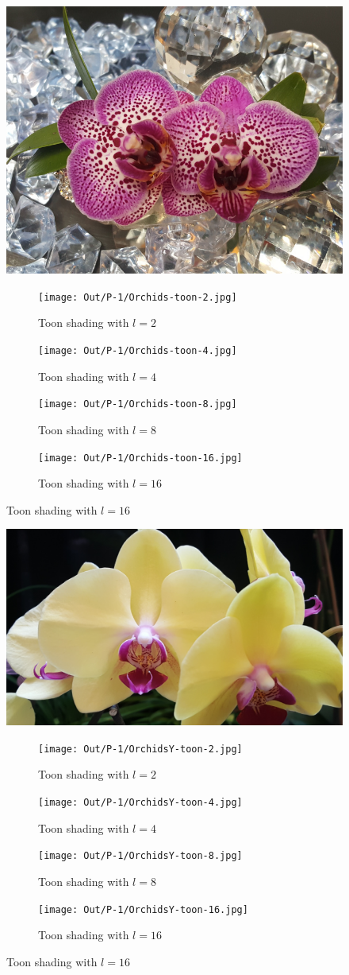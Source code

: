\documentclass[dvipsnames]{article}
\begin{document}
\begin{figure}[H]
	\centering\includegraphics[width=.5\linewidth]{Images/P-1/Orchids.jpg}
	\caption{Original Orchids.jpg}

	\begin{subfigure}{.33\linewidth}
		\centering\texttt{[image: Out/P-1/Orchids-toon-2.jpg]}
		\caption{Toon shading with $l = 2$}
	\end{subfigure}
	\begin{subfigure}{.33\linewidth}
		\centering\texttt{[image: Out/P-1/Orchids-toon-4.jpg]}
		\caption{Toon shading with $l = 4$}
	\end{subfigure}
	\begin{subfigure}{.33\linewidth}
		\centering\texttt{[image: Out/P-1/Orchids-toon-8.jpg]}
		\caption{Toon shading with $l = 8$}
	\end{subfigure}
	\begin{subfigure}{.33\linewidth}
		\centering\texttt{[image: Out/P-1/Orchids-toon-16.jpg]}
		\caption{Toon shading with $l = 16$}
	\end{subfigure}
\end{figure}

\begin{figure}[H]
	\centering\includegraphics[width=.5\linewidth]{Images/P-1/OrchidsY.jpg}
	\caption{Original OrchidsY.jpg}

	\begin{subfigure}{.33\linewidth}
		\centering\texttt{[image: Out/P-1/OrchidsY-toon-2.jpg]}
		\caption{Toon shading with $l = 2$}
	\end{subfigure}
	\begin{subfigure}{.33\linewidth}
		\centering\texttt{[image: Out/P-1/OrchidsY-toon-4.jpg]}
		\caption{Toon shading with $l = 4$}
	\end{subfigure}
	\begin{subfigure}{.33\linewidth}
		\centering\texttt{[image: Out/P-1/OrchidsY-toon-8.jpg]}
		\caption{Toon shading with $l = 8$}
	\end{subfigure}
	\begin{subfigure}{.33\linewidth}
		\centering\texttt{[image: Out/P-1/OrchidsY-toon-16.jpg]}
		\caption{Toon shading with $l = 16$}
	\end{subfigure}
\end{figure}
\end{document}
